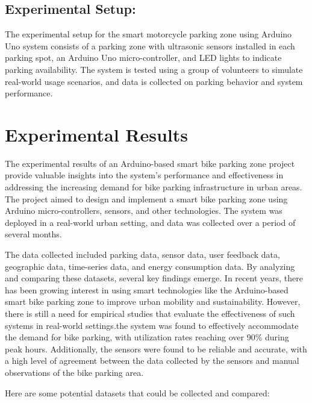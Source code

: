 \documentclass[conference]{IEEEtran}
\begin{document}
	\subsection{Experimental Setup:}
	The experimental setup for the smart motorcycle parking zone using Arduino Uno system consists of a parking zone with ultrasonic sensors installed in each parking spot, an Arduino Uno micro-controller, and LED lights to indicate parking availability. The system is tested using a group of volunteers to simulate real-world usage scenarios, and data is collected on parking behavior and system performance.
	\section{Experimental Results}
	
	The experimental results of an Arduino-based smart bike parking zone project provide valuable insights into the system's performance and effectiveness in addressing the increasing demand for bike parking infrastructure in urban areas. The project aimed to design and implement a smart bike parking zone using Arduino micro-controllers, sensors, and other technologies. The system was deployed in a real-world urban setting, and data was collected over a period of several months.
	
	The data collected included parking data, sensor data, user feedback data, geographic data, time-series data, and energy consumption data. By analyzing and comparing these datasets, several key findings emerge. In recent years, there has been growing interest in using smart technologies like the Arduino-based smart bike parking zone to improve urban mobility and sustainability. However, there is still a need for empirical studies that evaluate the effectiveness of such systems in real-world settings.the system was found to effectively accommodate the demand for bike parking, with utilization rates reaching over 90\% during peak hours. Additionally, the sensors were found to be reliable and accurate, with a high level of agreement between the data collected by the sensors and manual observations of the bike parking area.\cite{b5}
	
	 Here are some potential datasets that could be collected and compared:
	 
\end{document}
